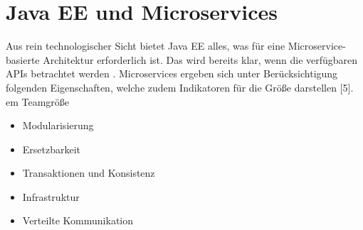 \section{Java EE und Microservices}
Aus rein technologischer Sicht bietet Java EE alles, was für eine Microservice-basierte Architektur erforderlich ist. Das wird bereits klar, wenn die verfügbaren APIs betrachtet werden \cite{jaxcenter.2016}. Microservices ergeben sich unter Berücksichtigung folgenden Eigenschaften, welche zudem Indikatoren für die Größe darstellen [5].                                                                                                                                                                                                                                                                                                                                                                                                                                                                                  em Teamgröße
\begin{itemize}
\item Modularisierung
\item Ersetzbarkeit
\item Transaktionen und Konsistenz
\item Infrastruktur
\item Verteilte Kommunikation	
\end{itemize}

